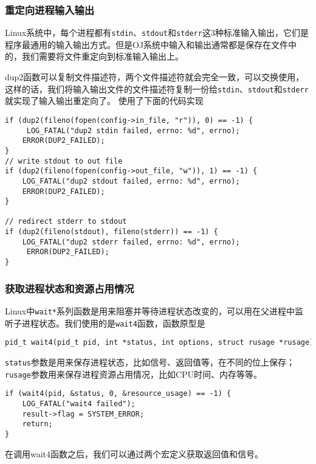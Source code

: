 \subsubsection{重定向进程输入输出}

Linux系统中，每个进程都有\texttt{stdin}、\texttt{stdout}和\texttt{stderr}这3种标准输入输出，它们是程序最通用的输入输出方式。但是OJ系统中输入和输出通常都是保存在文件中的，我们需要将文件重定向到标准输入输出上。

dup2函数可以复制文件描述符，两个文件描述符就会完全一致，可以交换使用，这样的话，我们将输入输出文件的文件描述符复制一份给\texttt{stdin}、\texttt{stdout}和\texttt{stderr}就实现了输入输出重定向了。
使用了下面的代码实现

\begin{verbatim}
if (dup2(fileno(fopen(config->in_file, "r")), 0) == -1) {
     LOG_FATAL("dup2 stdin failed, errno: %d", errno);
    ERROR(DUP2_FAILED);
}
// write stdout to out file
if (dup2(fileno(fopen(config->out_file, "w")), 1) == -1) {
    LOG_FATAL("dup2 stdout failed, errno: %d", errno);
    ERROR(DUP2_FAILED);
}

// redirect stderr to stdout
if (dup2(fileno(stdout), fileno(stderr)) == -1) {
    LOG_FATAL("dup2 stderr failed, errno: %d", errno);
     ERROR(DUP2_FAILED);
}
\end{verbatim}

\subsubsection{获取进程状态和资源占用情况}

Linux中\texttt{wait*}系列函数是用来阻塞并等待进程状态改变的，可以用在父进程中监听子进程状态。我们使用的是\texttt{wait4}函数，函数原型是

\begin{verbatim}
pid_t wait4(pid_t pid, int *status, int options, struct rusage *rusage);
\end{verbatim}

\texttt{status}参数是用来保存进程状态，比如信号、返回值等，在不同的位上保存；\texttt{rusage}参数用来保存进程资源占用情况，比如CPU时间、内存等等。

\begin{verbatim}
if (wait4(pid, &status, 0, &resource_usage) == -1) {
    LOG_FATAL("wait4 failed");
    result->flag = SYSTEM_ERROR;
    return;
}
\end{verbatim}

在调用wait4函数之后，我们可以通过两个宏定义获取返回值和信号。


